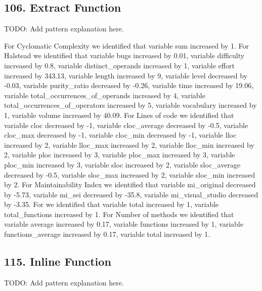 \subsection{106. Extract Function}

TODO: Add pattern explanation here.

For Cyclomatic Complexity we identified that variable sum increased by 1.
For Halstead we identified that variable bugs increased by 0.01, variable difficulty increased by 0.8, variable distinct\_operands increased by 1, variable effort increased by 343.13, variable length increased by 9, variable level decreased by -0.03, variable purity\_ratio decreased by -0.26, variable time increased by 19.06, variable total\_occurrences\_of\_operands increased by 4, variable total\_occurrences\_of\_operators increased by 5, variable vocabulary increased by 1, variable volume increased by 40.09.
For Lines of code we identified that variable cloc decreased by -1, variable cloc\_average decreased by -0.5, variable cloc\_max decreased by -1, variable cloc\_min decreased by -1, variable lloc increased by 2, variable lloc\_max increased by 2, variable lloc\_min increased by 2, variable ploc increased by 3, variable ploc\_max increased by 3, variable ploc\_min increased by 3, variable sloc increased by 2, variable sloc\_average decreased by -0.5, variable sloc\_max increased by 2, variable sloc\_min increased by 2.
For Maintainability Index we identified that variable mi\_original decreased by -5.73, variable mi\_sei decreased by -35.8, variable mi\_visual\_studio decreased by -3.35.
For  we identified that variable total increased by 1, variable total\_functions increased by 1.
For Number of methods we identified that variable average increased by 0.17, variable functions increased by 1, variable functions\_average increased by 0.17, variable total increased by 1.

\subsection{115. Inline Function}

TODO: Add pattern explanation here.

